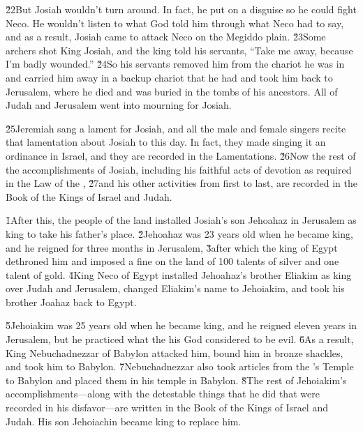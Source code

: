 \v{22}But Josiah wouldn't turn around. In fact, he put on a disguise so he could fight Neco. He wouldn't listen to what God told him through what Neco had to say, and as a result, Josiah came to attack Neco on the Megiddo plain. \v{23}Some archers shot King Josiah, and the king told his servants, ``Take me away, because I'm badly wounded.'' \v{24}So his servants removed him from the chariot he was in and carried him away in a backup chariot that he had and took him back to Jerusalem, where he died and was buried in the tombs of his ancestors. All of Judah and Jerusalem went into mourning for Josiah.

\v{25}Jeremiah sang a lament for Josiah, and all the male and female singers recite that lamentation about Josiah to this day. In fact, they made singing it an ordinance in Israel, and they are recorded in the Lamentations. \v{26}Now the rest of the accomplishments of Josiah, including his faithful acts of devotion as required in the Law of the , \v{27}and his other activities from first to last, are recorded in the Book of the Kings of Israel and Judah.

\v{1}After this, the people of the land installed Josiah's son Jehoahaz in Jerusalem as king to take his father's place. \v{2}Jehoahaz was 23 years old when he became king, and he reigned for three months in Jerusalem, \v{3}after which the king of Egypt dethroned him and imposed a fine on the land of 100 talents of silver and one talent of gold. \v{4}King Neco of Egypt installed Jehoahaz's brother Eliakim as king over Judah and Jerusalem, changed Eliakim's name to Jehoiakim, and took his brother Joahaz back to Egypt.

\v{5}Jehoiakim was 25 years old when he became king, and he reigned eleven years in Jerusalem, but he practiced what the  his God considered to be evil. \v{6}As a result, King Nebuchadnezzar of Babylon attacked him, bound him in bronze shackles, and took him to Babylon. \v{7}Nebuchadnezzar also took articles from the 's Temple to Babylon and placed them in his temple in Babylon. \v{8}The rest of Jehoiakim's accomplishments---along with the detestable things that he did that were recorded in his disfavor---are written in the Book of the Kings of Israel and Judah. His son Jehoiachin became king to replace him.

